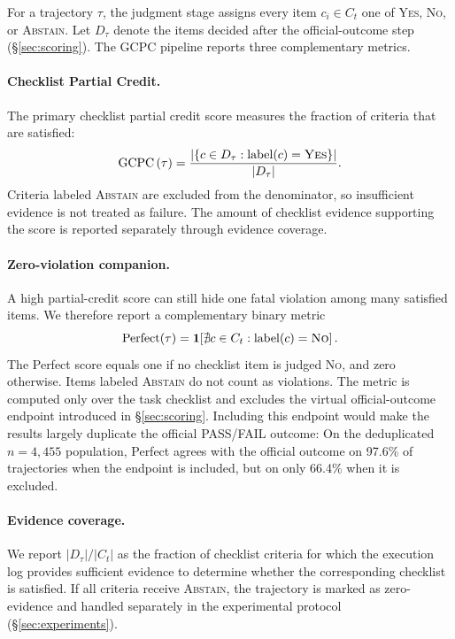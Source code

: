 \documentclass[sigconf,nonacm]{acmart}
\newcommand{\abstain}{\textsc{Abstain}}
\DeclareMathOperator{\cpc}{GCPC}
\begin{document}
For a trajectory $\tau$, the judgment stage assigns every item
$c_i\in C_t$ one of \textsc{Yes}, \textsc{No}, or \abstain{}. Let $D_\tau$
denote the items decided after the official-outcome step
(\S\ref{sec:scoring}). The GCPC pipeline reports three complementary metrics.

\paragraph{Checklist Partial Credit.}
The primary checklist partial credit score measures the fraction of criteria that are satisfied:
\begin{equation}
\label{eq:cpc}
\cpc{}(\tau)=
\frac{|\{c\in D_\tau:\operatorname{label}(c)=\textsc{Yes}\}|}
{|D_\tau|}.
\end{equation}
Criteria labeled \abstain{} are excluded from the denominator, so insufficient
evidence is not treated as failure. The amount of checklist evidence supporting
the score is reported separately through evidence coverage.
\paragraph{Zero-violation companion.}
A high partial-credit score can still hide one fatal violation among many satisfied items. We therefore report a complementary binary metric 
\begin{equation}
\mathrm{Perfect}(\tau)=
\mathbf{1}\!\left[\nexists c\in C_t:
\operatorname{label}(c)=\textsc{No}\right].
\end{equation}
The Perfect score equals one if no checklist item is judged
\textsc{No}, and zero otherwise. Items labeled \abstain{} do not count as
violations. The metric is computed only over the task checklist and excludes
the virtual official-outcome endpoint introduced in \S\ref{sec:scoring}.
Including this endpoint would make the results largely duplicate the
official PASS/FAIL outcome: On the deduplicated $n{=}4{,}455$ population,
Perfect agrees with the official outcome on 97.6\% of trajectories when the endpoint is included, but on only 66.4\% when it is excluded.

\paragraph{Evidence coverage.}
We report $|D_\tau|/|C_t|$ as the fraction of checklist criteria for which the execution log provides sufficient evidence to determine whether the corresponding checklist is satisfied. If all criteria receive \abstain{}, the trajectory is marked as zero-evidence and handled separately in the experimental protocol (\S\ref{sec:experiments}).
\end{document}
